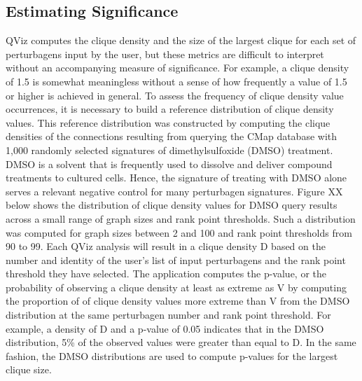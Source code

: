 \documentclass[12pt]{article}
\begin{document}
\subsection{Estimating Significance}
QViz computes the clique density and the size of the largest clique for each set of perturbagens input by the user, but these metrics are difficult to interpret without an accompanying measure of significance. For example, a clique density of 1.5 is somewhat meaningless without a sense of how frequently a value of 1.5 or higher is achieved in general. To assess the frequency of clique density value occurrences, it is necessary to build a reference distribution of clique density values. This reference distribution was constructed by computing the clique densities of the connections resulting from querying the CMap database with 1,000 randomly selected signatures of dimethylsulfoxide (DMSO) treatment. DMSO is a solvent that is frequently used to dissolve and deliver compound treatments to cultured cells. Hence, the signature of treating with DMSO alone serves a relevant negative control for many perturbagen signatures. 
Figure XX below shows the distribution of clique density values for DMSO query results across a small range of graph sizes and rank point thresholds. Such a distribution was computed for graph sizes between 2 and 100 and rank point thresholds from 90 to 99. Each QViz analysis will result in a clique density D based on the number and identity of the user's list of input perturbagens and the rank point threshold they have selected. The application computes the p-value, or the probability of observing a clique density at least as extreme as V by computing the proportion of of clique density values more extreme than V from the DMSO distribution at the same perturbagen number and rank point threshold. For example, a density of D and a p-value of 0.05 indicates that in the DMSO distribution, 5\% of the observed values were greater than equal to D. In the same fashion, the DMSO distributions are used to compute p-values for the largest clique size. 
\end{document}
